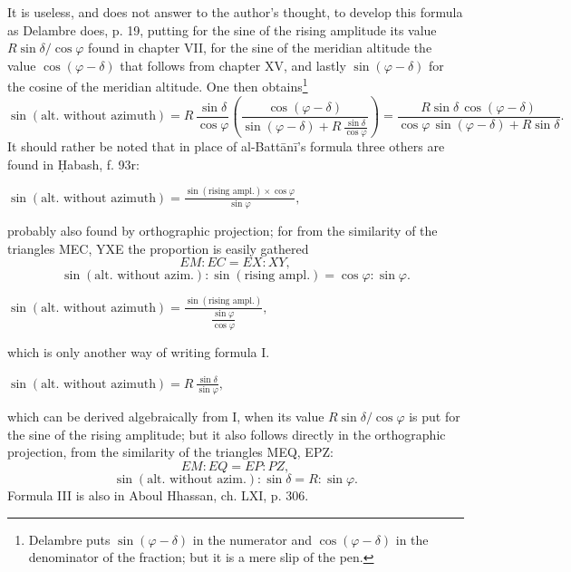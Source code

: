\documentclass[11pt]{article}
\begin{document}
\par It is useless, and does not answer to the author's thought, to develop this formula as Delambre does, p. 19, putting for the sine of the rising amplitude its value $R\sin\delta/\cos\varphi$ found in chapter VII, for the sine of the meridian altitude the value $\cos(\varphi - \delta)$ that follows from chapter XV, and lastly $\sin(\varphi - \delta)$ for the cosine of the meridian altitude. One then obtains\footnote{Delambre puts $\sin(\varphi - \delta)$ in the numerator and $\cos(\varphi - \delta)$ in the denominator of the fraction; but it is a mere slip of the pen.} \[ \sin(\text{alt. without azimuth}) = R\,\frac{\sin\delta}{\cos\varphi}\left(\frac{\cos(\varphi - \delta)}{\sin(\varphi - \delta) + R\,\frac{\sin\delta}{\cos\varphi}}\right) = \frac{R\sin\delta\,\cos(\varphi - \delta)}{\cos\varphi\,\sin(\varphi - \delta) + R\sin\delta}. \] It should rather be noted that in place of al-Battānī's formula three others are found in Ḥabash, f. 93r:\par
\begin{center}\end{center}
\par \par\noindent\hspace*{1.5em}$\displaystyle \sin(\text{alt. without azimuth}) = \frac{\sin(\text{rising ampl.}) \times \cos\varphi}{\sin\varphi},$\par probably also found by orthographic projection; for from the similarity of the triangles MEC, YXE the proportion is easily gathered \[ EM : EC = EX : XY, \] \[ \sin(\text{alt. without azim.}) : \sin(\text{rising ampl.}) = \cos\varphi : \sin\varphi. \] \par\noindent\hspace*{1.5em}$\displaystyle \sin(\text{alt. without azimuth}) = \frac{\sin(\text{rising ampl.})}{\dfrac{\sin\varphi}{\cos\varphi}},$\par which is only another way of writing formula I.\par
\begin{center}\end{center}
\par \par\noindent\hspace*{1.5em}$\displaystyle \sin(\text{alt. without azimuth}) = R\,\frac{\sin\delta}{\sin\varphi},$\par which can be derived algebraically from I, when its value $R\sin\delta/\cos\varphi$ is put for the sine of the rising amplitude; but it also follows directly in the orthographic projection, from the similarity of the triangles MEQ, EPZ: \[ EM : EQ = EP : PZ, \] \[ \sin(\text{alt. without azim.}) : \sin\delta = R : \sin\varphi. \] Formula III is also in Aboul Hhassan, ch. LXI, p. 306.\par
\end{document}
